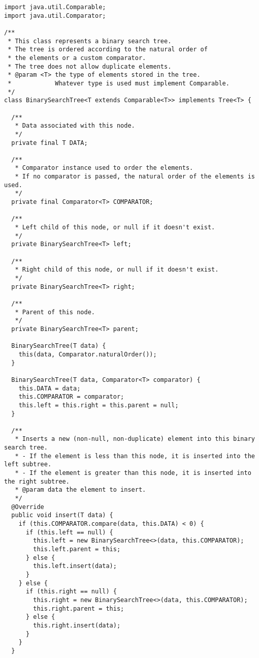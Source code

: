 \newpage %
\enlargethispage{-2\baselineskip}
\begin{lstlisting}[language=MyJava]
import java.util.Comparable;
import java.util.Comparator;

/**
 * This class represents a binary search tree.
 * The tree is ordered according to the natural order of 
 * the elements or a custom comparator.
 * The tree does not allow duplicate elements.
 * @param <T> the type of elements stored in the tree. 
 *            Whatever type is used must implement Comparable.
 */
class BinarySearchTree<T extends Comparable<T>> implements Tree<T> {

  /**
   * Data associated with this node.
   */
  private final T DATA;

  /**
   * Comparator instance used to order the elements.
   * If no comparator is passed, the natural order of the elements is used.
   */
  private final Comparator<T> COMPARATOR;

  /**
   * Left child of this node, or null if it doesn't exist.
   */
  private BinarySearchTree<T> left;

  /**
   * Right child of this node, or null if it doesn't exist.
   */
  private BinarySearchTree<T> right;

  /**
   * Parent of this node.
   */
  private BinarySearchTree<T> parent;

  BinarySearchTree(T data) {
    this(data, Comparator.naturalOrder());
  }

  BinarySearchTree(T data, Comparator<T> comparator) {
    this.DATA = data;
    this.COMPARATOR = comparator;
    this.left = this.right = this.parent = null;
  }

  /**
   * Inserts a new (non-null, non-duplicate) element into this binary search tree.
   * - If the element is less than this node, it is inserted into the left subtree.
   * - If the element is greater than this node, it is inserted into the right subtree.
   * @param data the element to insert.
   */
  @Override
  public void insert(T data) {
    if (this.COMPARATOR.compare(data, this.DATA) < 0) {
      if (this.left == null) {
        this.left = new BinarySearchTree<>(data, this.COMPARATOR);
        this.left.parent = this;
      } else {
        this.left.insert(data);
      }
    } else {
      if (this.right == null) {
        this.right = new BinarySearchTree<>(data, this.COMPARATOR);
        this.right.parent = this;
      } else {
        this.right.insert(data);
      }
    }
  }


\end{lstlisting}
